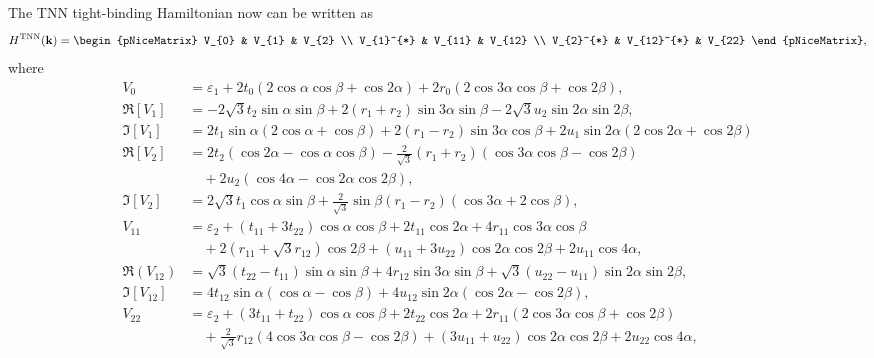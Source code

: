 \documentclass{report}
\begin{document}
The \ac{TNN} tight-binding Hamiltonian now can be written as
\begin{equation}
	\renewcommand{\arraystretch}{0.85}
	\begin{aligned}
		H^{\text{TNN}}(\mathbf{k})
		=
		\begin{pNiceMatrix}
			V_{0}     & V_{1}      & V_{2}  \\
			V_{1}^{*} & V_{11}     & V_{12} \\
			V_{2}^{*} & V_{12}^{*} & V_{22}
		\end{pNiceMatrix},
	\end{aligned}
\end{equation}
where
\begin{equation}
	\begin{aligned}
		V_0         & = \varepsilon_1 + 2t_0 (2\cos\alpha\cos\beta + \cos2\alpha) + 2r_0 (2\cos3\alpha\cos\beta+\cos2\beta),                                       \\
		\Re[V_1]    & = -2\sqrt{3}t_2 \sin \alpha \sin \beta + 2(r_1 + r_2)\sin 3 \alpha \sin \beta - 2\sqrt{3} u_2 \sin 2\alpha \sin 2\beta,                      \\
		\Im[V_1]    & = 2 t_1 \sin \alpha (2 \cos \alpha +\cos \beta) + 2(r_1 - r_2) \sin 3\alpha \cos \beta + 2u_1 \sin 2\alpha (2\cos 2\alpha + \cos 2\beta)     \\
		\Re[V_2]    & = 2t_2 (\cos 2\alpha - \cos \alpha \cos \beta) -\frac{2}{\sqrt{3}} (r_1 + r_2 ) (\cos 3\alpha \cos \beta - \cos 2 \beta)                     \\&\quad + 2u_2 (\cos 4\alpha -\cos 2\alpha \cos 2\beta),\\
		\Im[V_2]    & = 2\sqrt{3} t_1 \cos \alpha \sin \beta +\frac{2}{\sqrt{3}} \sin \beta (r_1 -r_2 )(\cos 3\alpha + 2\cos \beta),                               \\
		V_{11}      & = \varepsilon_2 + (t_{11}+3t_{22})\cos \alpha \cos \beta + 2 t_{11} \cos 2\alpha + 4r_{11} \cos 3\alpha \cos \beta                           \\ &\quad +2 (r_{11} + \sqrt{3} r_{12}) \cos 2\beta + (u_{11} + 3 u_{22})\cos 2 \alpha \cos 2\beta + 2 u_{11} \cos 4\alpha,\\
		\Re(V_{12}) & = \sqrt{3} (t_{22} - t_{11}) \sin \alpha \sin \beta +4 r_{12} \sin 3\alpha \sin \beta + \sqrt{3} (u_{22} - u_{11}) \sin 2\alpha \sin 2\beta, \\
		\Im[V_{12}] & = 4 t_{12} \sin \alpha (\cos \alpha -\cos \beta) + 4u_{12} \sin 2\alpha (\cos 2\alpha - \cos 2\beta),                                        \\
		V_{22}      & = \varepsilon_2 +(3t_{11} + t_{22}) \cos \alpha \cos \beta + 2 t_{22} \cos 2 \alpha + 2 r_{11}(2\cos 3\alpha \cos \beta + \cos 2 \beta)      \\&\quad + \frac{2}{\sqrt{3}} r_{12} (4\cos 3\alpha \cos \beta - \cos 2\beta) + (3 u_{11} + u_{22}) \cos 2\alpha \cos 2\beta + 2u_{22} \cos 4\alpha,
	\end{aligned}
\end{equation}
\end{document}

